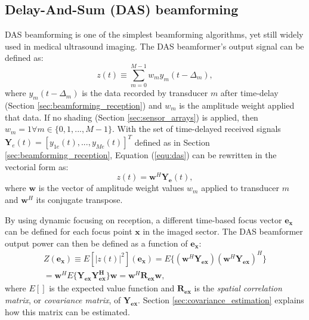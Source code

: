 \subsection{Delay-And-Sum (DAS) beamforming}
\label{sec:DAS}
DAS beamforming is one of the simplest beamforming algorithms, yet still widely used in medical ultrasound imaging. The DAS beamformer's output signal can be defined as:
\begin{equation}
    z(t) \equiv \sum_{m=0}^{M-1} w_m y_m(t - \Delta_m),
\label{equ:das}
\end{equation}
\noindent
where $y_m(t - \Delta_m)$ is the data recorded by transducer $m$ after time-delay (Section \ref{sec:beamforming_reception}) and $w_m$ is the amplitude weight applied that data. If no shading (Section \ref{sec:sensor_arrays}) is applied, then $w_m = 1 \forall m \in \{0, 1, ..., M-1\}$. 
With the set of time-delayed received signals $\boldsymbol{Y}_e(t) = [y_{1e}(t), ..., y_{Me}(t)]^T$ defined as in Section \ref{sec:beamforming_reception}, Equation (\ref{equ:das}) can be rewritten in the vectorial form as:
\begin{equation}
    z(t) = \boldsymbol{w}^H \boldsymbol{Y_e}(t),
\end{equation}
\noindent
where $\boldsymbol{w}$ is the vector of amplitude weight values $w_m$ applied to transducer $m$ and $\boldsymbol{w}^H$ its conjugate transpose.

By using dynamic focusing on reception, a different time-based focus vector $\boldsymbol{e_x}$ can be defined for each focus point $\boldsymbol{x}$ in the imaged sector. 
The DAS beamformer output power can then be defined as a function of $\boldsymbol{e_x}$:
\begin{equation}
\begin{split}
    Z(\boldsymbol{e_x}) \equiv E[|z(t)|^2](\boldsymbol{e_x}) = E\{(\boldsymbol{w}^H \boldsymbol{Y_{ex}})(\boldsymbol{w}^H \boldsymbol{Y_{ex}})^H\} \\
    = \boldsymbol{w}^H E\{\boldsymbol{Y_{ex}} \boldsymbol{Y_{ex}^H} \} \boldsymbol{w} = \boldsymbol{w}^H \boldsymbol{R_{ex}} \boldsymbol{w},
\end{split}
\label{eq:das_power}
\end{equation}
\noindent
where $E[]$ is the expected value function and $\boldsymbol{R_{ex}}$ is the \textit{spatial correlation matrix}, or \textit{covariance matrix}, of $\boldsymbol{Y_{ex}}$. Section \ref{sec:covariance_estimation} explains how this matrix can be estimated.

